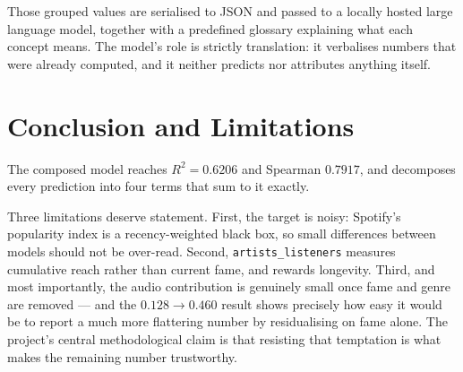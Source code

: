 \documentclass[10pt,twocolumn]{article}
\begin{document}
Those grouped values are serialised to JSON and passed to a locally hosted large
language model, together with a predefined glossary explaining what each concept
means. The model's role is strictly translation: it verbalises numbers that were
already computed, and it neither predicts nor attributes anything itself.

\section{Conclusion and Limitations}

The composed model reaches $R^2 = 0.6206$ and Spearman $0.7917$, and decomposes
every prediction into four terms that sum to it exactly.

Three limitations deserve statement. First, the target is noisy: Spotify's
popularity index is a recency-weighted black box, so small differences between
models should not be over-read. Second, \texttt{artists\_listeners} measures
cumulative reach rather than current fame, and rewards longevity. Third, and most
importantly, the audio contribution is genuinely small once fame and genre are
removed --- and the $0.128 \rightarrow 0.460$ result shows precisely how easy it
would be to report a much more flattering number by residualising on fame alone.
The project's central methodological claim is that resisting that temptation is
what makes the remaining number trustworthy.
\end{document}
